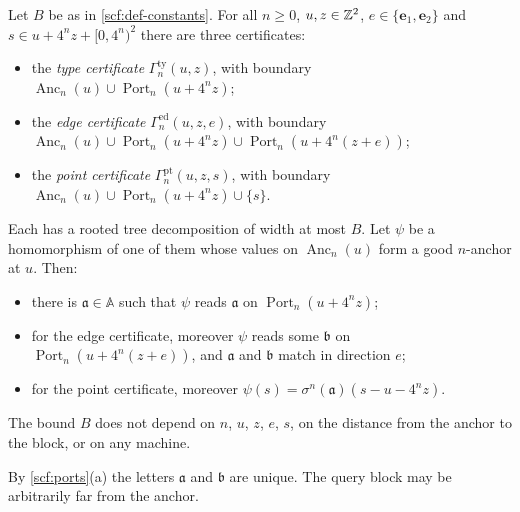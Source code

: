 \begin{theorem}[Parser]\label{thm:parser}
Let $B$ be as in \cref{scf:def-constants}. For all $n\ge0$, $u,z\in\mathbb{Z}^2$, $e\in\{\mathbf e_1,\mathbf e_2\}$ and $s\in u+4^nz+[0,4^n)^2$ there are three certificates:
\begin{itemize}
\item the \emph{type certificate} $\Gamma^{\mathrm{ty}}_n(u,z)$, with boundary $\operatorname{Anc}_n(u)\cup\operatorname{Port}_n(u+4^nz)$;
\item the \emph{edge certificate} $\Gamma^{\mathrm{ed}}_n(u,z,e)$, with boundary $\operatorname{Anc}_n(u)\cup\operatorname{Port}_n(u+4^nz)\cup\operatorname{Port}_n(u+4^n(z+e))$;
\item the \emph{point certificate} $\Gamma^{\mathrm{pt}}_n(u,z,s)$, with boundary $\operatorname{Anc}_n(u)\cup\operatorname{Port}_n(u+4^nz)\cup\{s\}$.
\end{itemize}
Each has a rooted tree decomposition of width at most $B$. Let $\psi$ be a homomorphism of one of them whose values on $\operatorname{Anc}_n(u)$ form a good $n$-anchor at $u$. Then:
\begin{itemize}
\item[(T)] there is $\mathfrak a\in\mathbb A$ such that $\psi$ reads $\mathfrak a$ on $\operatorname{Port}_n(u+4^nz)$;
\item[(E)] for the edge certificate, moreover $\psi$ reads some $\mathfrak b$ on $\operatorname{Port}_n(u+4^n(z+e))$, and $\mathfrak a$ and $\mathfrak b$ match in direction $e$;
\item[(P)] for the point certificate, moreover $\psi(s)=\sigma^n(\mathfrak a)(s-u-4^nz)$.
\end{itemize}
The bound $B$ does not depend on $n$, $u$, $z$, $e$, $s$, on the distance from the anchor to the block, or on any machine.
\end{theorem}

By \cref{scf:ports}(a) the letters $\mathfrak a$ and $\mathfrak b$ are unique. The query block may be arbitrarily far from the anchor.

